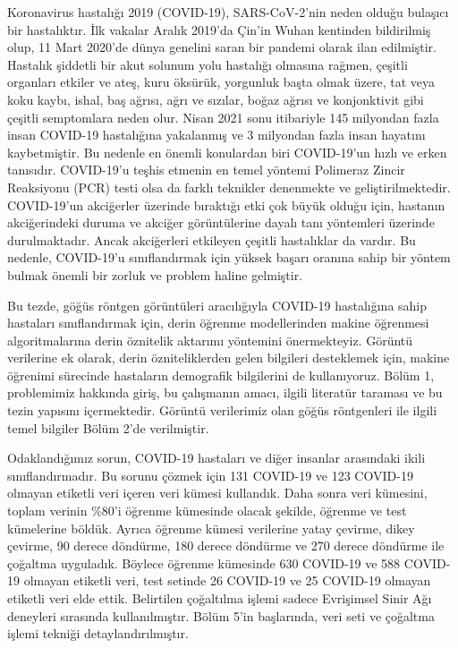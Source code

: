 Koronavirus hastalığı 2019 (COVID-19), SARS-CoV-2'nin neden olduğu bulaşıcı bir hastalıktır. İlk vakalar Aralık 2019'da Çin'in Wuhan kentinden bildirilmiş olup, 11 Mart 2020'de dünya genelini saran bir pandemi olarak ilan edilmiştir. Hastalık şiddetli bir akut solunum yolu hastalığı olmasına rağmen, çeşitli organları etkiler ve ateş, kuru öksürük, yorgunluk başta olmak üzere, tat veya koku kaybı, ishal, baş ağrısı, ağrı ve sızılar, boğaz ağrısı ve konjonktivit gibi çeşitli semptomlara neden olur. Nisan 2021 sonu itibariyle 145 milyondan fazla insan COVID-19 hastalığına yakalanmış ve 3 milyondan fazla insan hayatını kaybetmiştir. Bu nedenle en önemli konulardan biri COVID-19'un hızlı ve erken tanısıdır. COVID-19'u teşhis etmenin en temel yöntemi Polimeraz Zincir Reaksiyonu (PCR) testi olsa da farklı teknikler denenmekte ve geliştirilmektedir. COVID-19'un akciğerler üzerinde bıraktığı etki çok büyük olduğu için, hastanın akciğerindeki duruma ve akciğer görüntülerine dayalı tanı yöntemleri üzerinde durulmaktadır. Ancak akciğerleri etkileyen çeşitli hastalıklar da vardır. Bu nedenle, COVID-19'u sınıflandırmak için yüksek başarı oranına sahip bir yöntem bulmak önemli bir zorluk ve problem haline gelmiştir.

Bu tezde, göğüs röntgen görüntüleri aracılığıyla COVID-19 hastalığına sahip hastaları sınıflandırmak için, derin öğrenme modellerinden makine öğrenmesi algoritmalarına derin öznitelik aktarımı yöntemini önermekteyiz. Görüntü verilerine ek olarak, derin özniteliklerden gelen bilgileri desteklemek için, makine öğrenimi sürecinde hastaların demografik bilgilerini de kullanıyoruz. Bölüm 1, problemimiz hakkında giriş, bu çalışmanın amacı, ilgili literatür taraması ve bu tezin yapısını içermektedir. Görüntü verilerimiz olan göğüs röntgenleri ile ilgili temel bilgiler Bölüm 2'de verilmiştir.

Odaklandığımız sorun, COVID-19 hastaları ve diğer insanlar arasındaki ikili sınıflandırmadır. Bu sorunu çözmek için 131 COVID-19 ve 123 COVID-19 olmayan etiketli veri içeren veri kümesi kullandık. Daha sonra veri kümesini, toplam verinin \%80'i öğrenme kümesinde olacak şekilde, öğrenme ve test kümelerine böldük. Ayrıca öğrenme kümesi verilerine yatay çevirme, dikey çevirme, 90 derece döndürme, 180 derece döndürme ve 270 derece döndürme ile çoğaltma uyguladık. Böylece öğrenme kümesinde 630 COVID-19 ve 588 COVID-19 olmayan etiketli veri, test setinde 26 COVID-19 ve 25 COVID-19 olmayan etiketli veri elde ettik. Belirtilen çoğaltılma işlemi sadece Evrişimsel Sinir Ağı deneyleri sırasında kullanılmıştır. Bölüm 5'in başlarında, veri seti ve çoğaltma işlemi tekniği detaylandırılmıştır.

